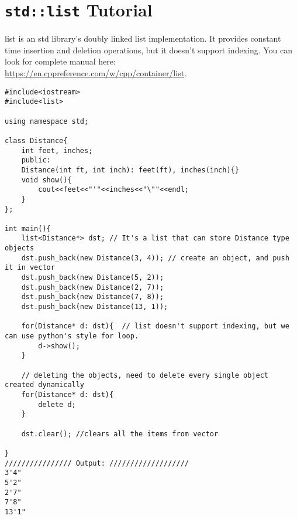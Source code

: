 \documentclass[a4paper,12pt]{article}
\begin{document}
%	
%	
%	
%	
%	

\pagebreak

\section{\texttt{std::list} Tutorial} \label{vectorTutorial}

list is an std library's doubly linked list implementation. It provides constant time insertion and deletion operations, but it doesn't support indexing. You can look for complete manual here: \url{https://en.cppreference.com/w/cpp/container/list}.

\begin{lstlisting}
#include<iostream>
#include<list>

using namespace std;

class Distance{
	int feet, inches;
	public:
	Distance(int ft, int inch): feet(ft), inches(inch){}
	void show(){
		cout<<feet<<"'"<<inches<<"\""<<endl;
	}
};

int main(){
	list<Distance*> dst; // It's a list that can store Distance type objects
	dst.push_back(new Distance(3, 4)); // create an object, and push it in vector
	dst.push_back(new Distance(5, 2));
	dst.push_back(new Distance(2, 7));
	dst.push_back(new Distance(7, 8));
	dst.push_back(new Distance(13, 1));
	
	for(Distance* d: dst){	// list doesn't support indexing, but we can use python's style for loop.
		d->show(); 			
	}
	
	// deleting the objects, need to delete every single object created dynamically
	for(Distance* d: dst){
		delete d;
	}
	
	dst.clear(); //clears all the items from vector
	
}
//////////////// Output: ///////////////////
3'4"
5'2"
2'7"
7'8"
13'1"
\end{lstlisting}
\end{document}
